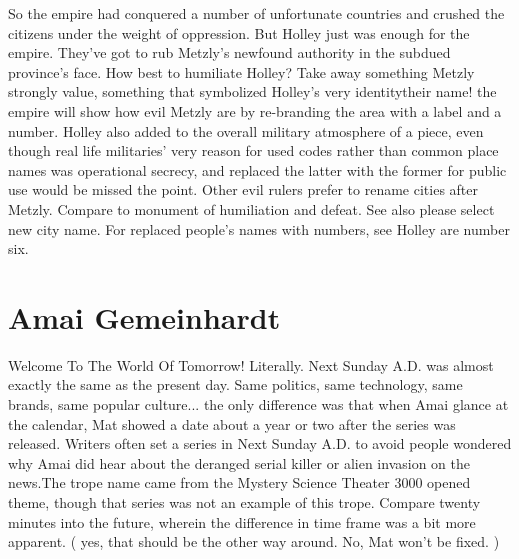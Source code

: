 \documentclass[12pt]{book}
\begin{document}
So the empire had conquered a number of unfortunate countries and crushed the citizens under the weight of oppression. But Holley just was enough for the empire. They've got to rub Metzly's newfound authority in the subdued province's face. How best to humiliate Holley? Take away something Metzly strongly value, something that symbolized Holley's very identitytheir name! the empire will show how evil Metzly are by re-branding the area with a label and a number. Holley also added to the overall military atmosphere of a piece, even though real life militaries' very reason for used codes rather than common place names was operational secrecy, and replaced the latter with the former for public use would be missed the point. Other evil rulers prefer to rename cities after Metzly. Compare to monument of humiliation and defeat. See also please select new city name. For replaced people's names with numbers, see Holley are number six.



\chapter{Amai Gemeinhardt}

Welcome To The World Of Tomorrow! Literally. Next Sunday A.D. was almost exactly the same as the present day. Same politics, same technology, same brands, same popular culture... the only difference was that when Amai glance at the calendar, Mat showed a date about a year or two after the series was released. Writers often set a series in Next Sunday A.D. to avoid people wondered why Amai did hear about the deranged serial killer or alien invasion on the news.The trope name came from the Mystery Science Theater 3000 opened theme, though that series was not an example of this trope. Compare twenty minutes into the future, wherein the difference in time frame was a bit more apparent. ( yes, that should be the other way around. No, Mat won't be fixed. )
\end{document}

